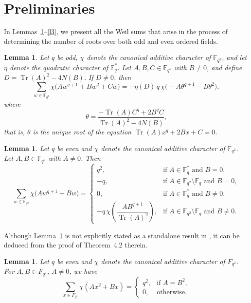\documentclass[12pt]{amsart}
\newtheorem{lemma}[theorem]{Lemma}
\theoremstyle{definition}
\theoremstyle{remark}
\numberwithin{equation}{section}
\begin{document}
    \section {Preliminaries}
    In Lemmas~\ref{l1}--\ref{l3}, we present all the Weil sums that arise in the process of determining the number of roots over both odd and even ordered fields.
    \begin{lemma}\cite{r1}\label{l1}
        Let $q$ be odd, $\chi$ denote the canonical additive character of $\mathbb{F}_{q^2}$, and let $\eta$ denote the quadratic character of $\mathbb{F}_q^{*}$. Let $A, B, C \in \mathbb{F}_{q^2}$ with $B \neq 0$, and define $D = \operatorname{Tr}(A)^2 - 4N(B)$. If $D \neq 0$, then  
$$
\sum_{w \in \mathbb{F}_{q^2}} \chi\big( Aw^{q+1} + Bw^2 + Cw \big)
= - \eta(D) \, q \, \chi\big( -A\theta^{q+1} - B\theta^2 \big),
$$
where  
$$
\theta = \frac{-\operatorname{Tr}(A)C^q + 2B^q C}{\operatorname{Tr}(A)^2 - 4N(B)},
$$
that is, $\theta$ is the unique root of the equation $\operatorname{Tr}(A)x^q + 2Bx + C = 0$. 
\end{lemma}
\begin{lemma}\cite{r2}\label{l2}
    Let $q$ be even and $\chi$ denote the canonical additive character of $\mathbb{F}_{q^2}$. Let $A, B \in \mathbb{F}_{q^2}$ with $A \neq 0$. Then
$$
\sum_{w \in \mathbb{F}_{q^2}} \chi\big( A w^{q+1} + B w \big) =
\begin{cases}
q^2, & \text{if } A \in \mathbb{F}_q^* \text{ and } B = 0, \\
-q, & \text{if } A \in \mathbb{F}_{q^2}\setminus\mathbb{F}_{q} \text{ and } B=0,
\\
0, & \text{if } A \in \mathbb{F}_q^* \text{ and } B \neq 0, \\
- q \, \chi\left( \dfrac{A B^{q+1}}{\operatorname{Tr}(A)^2} \right), & \text{if } A \in \mathbb{F}_{q^2} \setminus \mathbb{F}_q \text{ and }B\neq0.
\end{cases}
$$
\end{lemma}
Although Lemma~\ref{l2.3} is not explicitly stated as a standalone result in \cite{r2}, it can be deduced from the proof of Theorem~4.2 therein.
\begin{lemma}\cite{r2}\label{l2.3}
    Let $q$ be even and $\chi$ denote the canonical additive character of $F_{q^2}$. For $A,B\in F_{q^2}$, $A\neq 0$, we have
$$
\sum_{x\in F_{q^2}} \chi(Ax^2+Bx)
=
\begin{cases}
q^2, & \text{if } A=B^2,\\
0, & \text{otherwise}.
\end{cases}
$$
\end{lemma}
\end{document}
